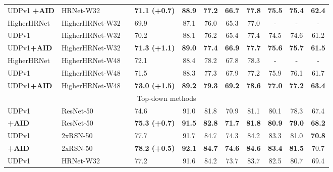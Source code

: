\documentclass[final]{cvpr}
\begin{document}
\begin{table*}
\begin{center}
\begin{tabular}{l|l|c|lccccccc}
UDPv1 \textbf{+AID}      & HRNet-W32     &    &\textbf{71.1 (+0.7)}  &\textbf{88.9}  &\textbf{77.2}  &\textbf{66.7}  &\textbf{77.8}  &\textbf{75.5} &\textbf{75.4}  &\textbf{62.4}\\
HigherHRNet \cite{Higher}& HigherHRNet-W32&   &69.9                 & 87.1          & 76.0          & 65.3          &77.0           & -            &-              &-   \\
UDPv1 \cite{UDP}         & HigherHRNet-W32&   &70.2                 & 88.1          & 76.2          & 65.4          &77.4           &74.5          &74.6           &61.2\\
UDPv1\textbf{+AID}      & HigherHRNet-W32&   &\textbf{71.3 (+1.1)}  &\textbf{89.0}  &\textbf{77.4}  &\textbf{66.9}  &\textbf{77.7}  &\textbf{75.6} &\textbf{75.7}  &\textbf{61.5}\\
HigherHRNet \cite{Higher}& HigherHRNet-W48&   &72.1                 & 88.4          & 78.2          & 67.8          &78.3           & -            &-              &-   \\
UDPv1 \cite{UDP}         & HigherHRNet-W48&   &71.5                 & 88.3          & 77.3          & 67.9          &77.2           &75.9          &76.1           &61.7\\
UDPv1\textbf{+AID}      & HigherHRNet-W48&   &\textbf{73.0 (+1.5)}  &\textbf{89.2}  &\textbf{79.3}  &\textbf{69.2}  &\textbf{78.6}  &\textbf{77.0} &\textbf{77.2}  &\textbf{63.4}\\
\hline
\multicolumn{11}{c}{Top-down methods}\\
\hline
UDPv1 \cite{UDP}         & ResNet-50     &    &74.6                 & 91.0          & 81.8          & 70.9          &81.1           &80.1          &78.3           &67.4\\
\textbf{+AID}            & ResNet-50     &    &\textbf{75.3 (+0.7)}  &\textbf{91.5}  &\textbf{82.8}  &\textbf{71.7}  &\textbf{81.8}  &\textbf{80.9} &\textbf{79.0}  &\textbf{68.2}\\
UDPv1 \cite{UDP}         & 2xRSN-50      &    &77.7                 & 91.7          & 84.7          & 74.3          &84.2           &83.3          &81.0           &\textbf{70.8}\\
\textbf{+AID}            & 2xRSN-50      &    &\textbf{78.2 (+0.5)}  &\textbf{92.1}  &\textbf{84.7}  &\textbf{74.6}  &\textbf{84.6}  &\textbf{83.4} &\textbf{81.5}  &70.7\\
UDPv1 \cite{UDP}         & HRNet-W32     &    &77.2                 & 91.6          & 84.2          & 73.7          &83.7           &82.5          &80.7           &69.4\\

\end{tabular}
\end{center}
\end{table*}
\end{document}
